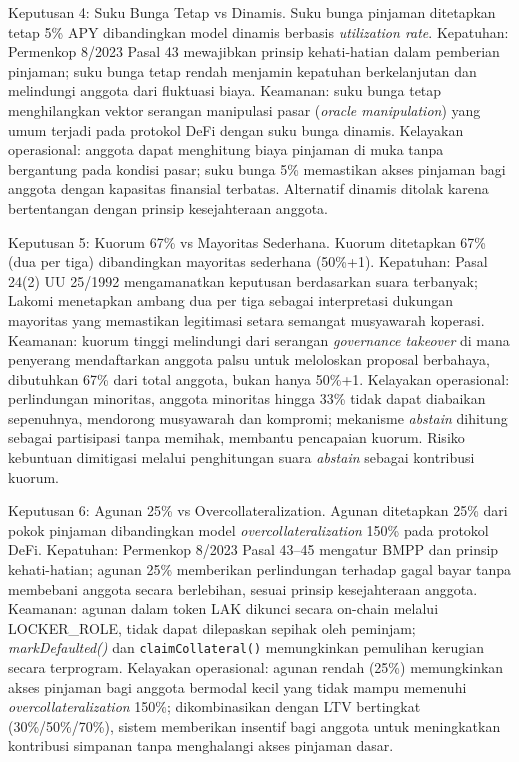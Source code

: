Keputusan 4: Suku Bunga Tetap vs Dinamis. Suku bunga pinjaman ditetapkan tetap 5\% APY dibandingkan model dinamis berbasis \textit{utilization rate}. Kepatuhan: Permenkop 8/2023 Pasal 43 mewajibkan prinsip kehati-hatian dalam pemberian pinjaman; suku bunga tetap rendah menjamin kepatuhan berkelanjutan dan melindungi anggota dari fluktuasi biaya. Keamanan: suku bunga tetap menghilangkan vektor serangan manipulasi pasar (\textit{oracle manipulation}) yang umum terjadi pada protokol DeFi dengan suku bunga dinamis. Kelayakan operasional: anggota dapat menghitung biaya pinjaman di muka tanpa bergantung pada kondisi pasar; suku bunga 5\% memastikan akses pinjaman bagi anggota dengan kapasitas finansial terbatas. Alternatif dinamis ditolak karena bertentangan dengan prinsip kesejahteraan anggota.

Keputusan 5: Kuorum 67\% vs Mayoritas Sederhana. Kuorum ditetapkan 67\% (dua per tiga) dibandingkan mayoritas sederhana (50\%+1). Kepatuhan: Pasal 24(2) UU 25/1992 mengamanatkan keputusan berdasarkan suara terbanyak; Lakomi menetapkan ambang dua per tiga sebagai interpretasi dukungan mayoritas yang memastikan legitimasi setara semangat musyawarah koperasi. Keamanan: kuorum tinggi melindungi dari serangan \textit{governance takeover} di mana penyerang mendaftarkan anggota palsu untuk meloloskan proposal berbahaya, dibutuhkan 67\% dari total anggota, bukan hanya 50\%+1. Kelayakan operasional: perlindungan minoritas, anggota minoritas hingga 33\% tidak dapat diabaikan sepenuhnya, mendorong musyawarah dan kompromi; mekanisme \textit{abstain} dihitung sebagai partisipasi tanpa memihak, membantu pencapaian kuorum. Risiko kebuntuan dimitigasi melalui penghitungan suara \textit{abstain} sebagai kontribusi kuorum.

Keputusan 6: Agunan 25\% vs Overcollateralization. Agunan ditetapkan 25\% dari pokok pinjaman dibandingkan model \textit{overcollateralization} 150\% pada protokol DeFi. Kepatuhan: Permenkop 8/2023 Pasal 43--45 mengatur BMPP dan prinsip kehati-hatian; agunan 25\% memberikan perlindungan terhadap gagal bayar tanpa membebani anggota secara berlebihan, sesuai prinsip kesejahteraan anggota. Keamanan: agunan dalam token LAK dikunci secara on-chain melalui LOCKER\_ROLE, tidak dapat dilepaskan sepihak oleh peminjam; \textit{markDefaulted()} dan \texttt{claimCollateral()} memungkinkan pemulihan kerugian secara terprogram. Kelayakan operasional: agunan rendah (25\%) memungkinkan akses pinjaman bagi anggota bermodal kecil yang tidak mampu memenuhi \textit{overcollateralization} 150\%; dikombinasikan dengan LTV bertingkat (30\%/50\%/70\%), sistem memberikan insentif bagi anggota untuk meningkatkan kontribusi simpanan tanpa menghalangi akses pinjaman dasar.

